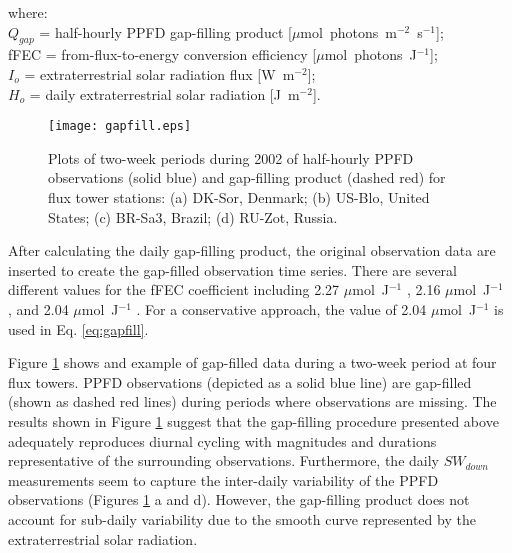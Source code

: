 \noindent where:\\
\indent $Q_{gap}$ = half-hourly PPFD gap-filling product [$\mu$mol~photons~m$^{-2}$~s$^{-1}$];\\ 
\indent fFEC = from-flux-to-energy conversion efficiency [$\mu$mol~photons~J$^{-1}$];\\
\indent $I_o$ = extraterrestrial solar radiation flux [W~m$^{-2}$];\\
\indent $H_o$ = daily extraterrestrial solar radiation [J~m$^{-2}$].\\
\begin{figure}[h!]
    \texttt{[image: gapfill.eps]}
    \caption{Plots of two-week periods during 2002 of half-hourly PPFD 
    observations (solid blue) and gap-filling product (dashed red) for flux 
    tower stations: (a) DK-Sor, Denmark; (b) US-Blo, United States; (c) BR-Sa3, 
    Brazil; (d) RU-Zot, Russia.}
    \label{fig:gapfill}
\end{figure}

\noindent After calculating the daily gap-filling product, the original observation data are inserted to create the gap-filled observation time series.  
There are several different values for the fFEC coefficient including 2.27 $\mu$mol~J$^{-1}$ \parencite{prentice93}, 2.16 $\mu$mol~J$^{-1}$ \parencite{ge11}, and 2.04 $\mu$mol~J$^{-1}$ \parencite{meek84}. 
For a conservative approach, the value of 2.04 $\mu$mol~J$^{-1}$ is used in Eq. \ref{eq:gapfill}.

Figure \ref{fig:gapfill} shows and example of gap-filled data during a two-week period at four flux towers.  
PPFD observations (depicted as a solid blue line) are gap-filled (shown as dashed red lines) during periods where observations are missing.  
The results shown in Figure \ref{fig:gapfill} suggest that the gap-filling procedure presented above adequately reproduces diurnal cycling with magnitudes and durations representative of the surrounding observations.  
Furthermore, the daily $SW_{down}$ measurements seem to capture the inter-daily variability of the PPFD observations (Figures \ref{fig:gapfill} a and d). 
However, the gap-filling product does not account for sub-daily variability due to the smooth curve represented by the extraterrestrial solar radiation.

